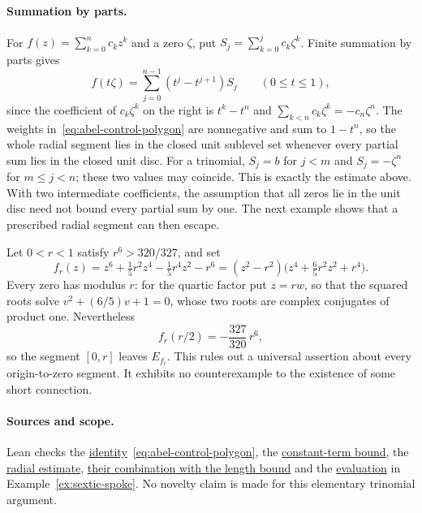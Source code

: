 \paragraph{Summation by parts.}
\label{subsec:abel-mechanism}
For $f(z)=\sum_{k=0}^nc_kz^k$ and a zero $\zeta$, put
$S_j=\sum_{k=0}^jc_k\zeta^k$.  Finite summation by parts gives
\begin{equation}\label{eq:abel-control-polygon}
 f(t\zeta)=\sum_{j=0}^{n-1}(t^j-t^{j+1})S_j\qquad(0\le t\le1),
\end{equation}
since the coefficient of $c_k\zeta^k$ on the right is $t^k-t^n$ and
$\sum_{k<n}c_k\zeta^k=-c_n\zeta^n$.  The weights
in~\eqref{eq:abel-control-polygon} are nonnegative and sum to $1-t^n$, so the
whole radial segment lies in the closed unit sublevel set whenever every partial sum lies in the closed
unit disc. For a trinomial, $S_j=b$ for $j<m$ and $S_j=-\zeta^n$
for $m\le j<n$; these two values may coincide. This is exactly the
estimate above. With two intermediate coefficients, the assumption
that all zeros lie in the unit disc need not bound every partial sum
by one. The next
example shows that a prescribed radial segment can then escape.

\begin{example}\label{ex:sextic-spoke}
Let $0<r<1$ satisfy $r^6>320/327$, and set
\[
 f_r(z)=z^6+\tfrac15r^2z^4-\tfrac15r^4z^2-r^6
       =(z^2-r^2)\bigl(z^4+\tfrac65r^2z^2+r^4\bigr).
\]
Every zero has modulus $r$: for the quartic factor put $z=rw$, so that the
squared roots solve $v^2+(6/5)v+1=0$, whose two roots are complex conjugates
of product one.  Nevertheless
\[
 f_r(r/2)=-\frac{327}{320}\,r^6,
\]
so the segment $[0,r]$ leaves $E_{f_r}$.  This rules out a universal assertion
about every origin-to-zero segment.  It exhibits no counterexample to the
existence of some short connection.
\end{example}

\paragraph{Sources and scope.}
\label{bdry:trinomial}
Lean checks the
\href{https://github.com/wcook04/plectis-erdos/blob/0ba585f632fbbbb43af2ee9532d4e83752af3f67/ErdosProblems/Erdos1041/AbelControlPolygon.lean\#L123}{identity}~\eqref{eq:abel-control-polygon}, the
\href{https://github.com/wcook04/plectis-erdos/blob/0ba585f632fbbbb43af2ee9532d4e83752af3f67/ErdosProblems/Erdos1041/AbelControlPolygon.lean\#L258}{constant-term bound},
the
\href{https://github.com/wcook04/plectis-erdos/blob/0ba585f632fbbbb43af2ee9532d4e83752af3f67/ErdosProblems/Erdos1041/AbelControlPolygon.lean\#L219}{radial estimate},
\href{https://github.com/wcook04/plectis-erdos/blob/0ba585f632fbbbb43af2ee9532d4e83752af3f67/ErdosProblems/Erdos1041/AbelControlPolygon.lean\#L330}{their combination with the length bound}
and the
\href{https://github.com/wcook04/plectis-erdos/blob/0ba585f632fbbbb43af2ee9532d4e83752af3f67/ErdosProblems/Erdos1041/AbelControlPolygon.lean\#L555}{evaluation} in Example~\ref{ex:sextic-spoke}.  No novelty claim is made for this elementary trinomial argument.


